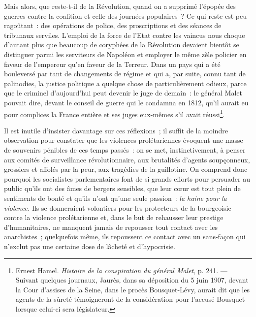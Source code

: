 \documentclass[french,twoside]{book} %
\begin{document}
Mais alors, que reste-t-il de la Révolution, quand on  a supprimé l’épopée des guerres contre la coalition et celle des journées populaires ? Ce qui reste est peu ragoûtant : des opérations de police, des proscriptions et des séances de tribunaux serviles. L’emploi de la force de l’Etat contre les vaincus nous choque d’autant plus que beaucoup de coryphées de la Révolution devaient bientôt se distinguer parmi les serviteurs de Napoléon et employer le même zèle policier en faveur de l’empereur qu’en faveur de la Terreur. Dans un pays qui a été bouleversé par tant de changements de régime et qui a, par suite, connu tant de palinodies, la justice politique a quelque chose de particulièrement odieux, parce que le criminel d’aujourd’hui peut devenir le juge de demain : le général Malet pouvait dire, devant le conseil de guerre qui le condamna en 1812, qu’il aurait eu pour complices la France entière et ses juges eux-mêmes s’il avait réussi\footnote{ \noindent Ernest Hamel. \emph{Histoire de la conspiration du général Malet}, p. 241. — Suivant quelques journaux, Jaurès, dans sa déposition du 5 juin 1907, devant la Cour d’assises de la Seine, dans le procès Bousquet-Lévy, aurait dit que les agents de la sûreté témoigneront de la considération pour l’accusé Bousquet lorsque celui-ci sera législateur.
 }.\par
Il est inutile d’insister davantage sur ces réflexions ; il suffit de la moindre observation pour constater que les violences prolétariennes évoquent une masse de souvenirs pénibles de ces temps passés : on se met, instinctivement, à penser aux comités de surveillance révolutionnaire, aux brutalités d’agents soupçonneux, grossiers  et affolés par la peur, aux tragédies de la guillotine. On comprend donc pourquoi les socialistes parlementaires font de si grands efforts pour persuader au public qu’ils ont des âmes de bergers sensibles, que leur cœur est tout plein de sentiments de bonté et qu’ils n’ont qu’une seule passion : \emph{la haine pour la violence.} Ils se donneraient volontiers pour les protecteurs de la bourgeoisie contre la violence prolétarienne et, dans le but de rehausser leur prestige d’humanitaires, ne manquent jamais de repousser tout contact avec les anarchistes ; quelquefois même, ils repoussent ce contact avec un sans-façon qui n’exclut pas une certaine dose de lâcheté et d’hypocrisie.\par
\end{document}

